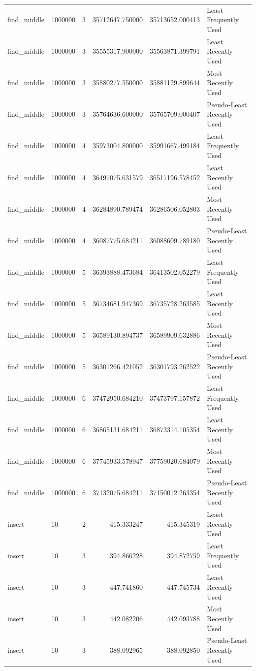 \begin{tabular}{llrrrl}
find_middle & 1000000 & 3 & 35712647.750000 & 35713652.000413 & Least Frequently Used \\
find_middle & 1000000 & 3 & 35555317.900000 & 35563871.399791 & Least Recently Used \\
find_middle & 1000000 & 3 & 35880277.550000 & 35881129.899644 & Most Recently Used \\
find_middle & 1000000 & 3 & 35764636.600000 & 35765709.000407 & Pseudo-Least Recently Used \\
find_middle & 1000000 & 4 & 35973004.800000 & 35991667.499184 & Least Frequently Used \\
find_middle & 1000000 & 4 & 36497075.631579 & 36517196.578452 & Least Recently Used \\
find_middle & 1000000 & 4 & 36284890.789474 & 36286506.052803 & Most Recently Used \\
find_middle & 1000000 & 4 & 36087775.684211 & 36088609.789180 & Pseudo-Least Recently Used \\
find_middle & 1000000 & 5 & 36393888.473684 & 36413502.052279 & Least Frequently Used \\
find_middle & 1000000 & 5 & 36734681.947369 & 36735728.263585 & Least Recently Used \\
find_middle & 1000000 & 5 & 36589130.894737 & 36589909.632886 & Most Recently Used \\
find_middle & 1000000 & 5 & 36301266.421052 & 36301793.262522 & Pseudo-Least Recently Used \\
find_middle & 1000000 & 6 & 37472950.684210 & 37473797.157872 & Least Frequently Used \\
find_middle & 1000000 & 6 & 36865131.684211 & 36873314.105354 & Least Recently Used \\
find_middle & 1000000 & 6 & 37745933.578947 & 37759020.684079 & Most Recently Used \\
find_middle & 1000000 & 6 & 37132075.684211 & 37150012.263354 & Pseudo-Least Recently Used \\
insert & 10 & 2 & 415.333247 & 415.345319 & Least Recently Used \\
insert & 10 & 3 & 394.866228 & 394.872759 & Least Frequently Used \\
insert & 10 & 3 & 447.741860 & 447.745734 & Least Recently Used \\
insert & 10 & 3 & 442.082206 & 442.093788 & Most Recently Used \\
insert & 10 & 3 & 388.092965 & 388.092850 & Pseudo-Least Recently Used \\

\end{tabular}
